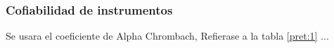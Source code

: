 \documentclass[12pt,a4paper]{article}
\begin{document}

\subsubsection{Cofiabilidad de instrumentos}
Se usara el coeficiente de Alpha Chrombach, Refierase a la tabla \ref{pret:1} ...

%
%

\end{document}
